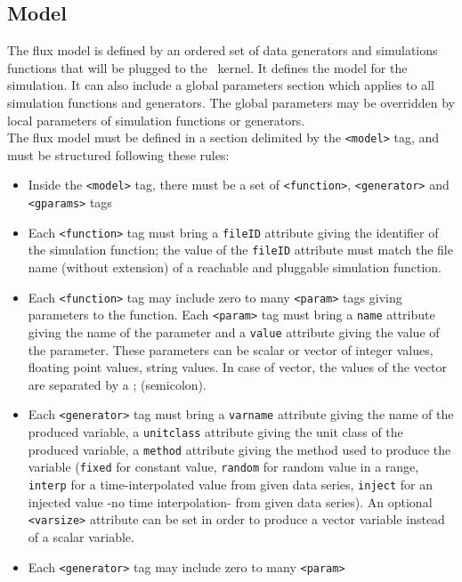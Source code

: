 \subsection{Model}

The flux model is defined by an ordered set of data generators and simulations
functions that will be plugged to the \OFname \ kernel. It defines the model
for the simulation. It can also include a global parameters section which
applies to all simulation functions and generators. The global parameters may
be overridden by local parameters of simulation functions or generators.\\
\noindent The flux model must be defined in a section delimited by the
\texttt{<model>} tag, and must be structured following these rules:
\begin{itemize}
  \item Inside the \texttt{<model>} tag, there must be a set of
  \texttt{<function>}, \texttt{<generator>} and \texttt{<gparams>} tags
  \item Each \texttt{<function>} tag must bring a \texttt{fileID} attribute giving
  the identifier of the simulation function; the value of the \texttt{fileID}
  attribute must match the file name (without extension) of a reachable and
  pluggable simulation function.
  \item Each \texttt{<function>} tag may include zero to many \texttt{<param>} tags giving
  parameters to the function. Each \texttt{<param>} tag must bring a \texttt{name} attribute giving
  the name of the parameter and a \texttt{value} attribute giving the value of the parameter. These parameters can be scalar or vector of integer values, floating point values, string values. In case of vector, the values of the vector are separated by a ; (semicolon).
  \item Each \texttt{<generator>} tag must bring a \texttt{varname} attribute giving 
  the name of the produced variable, a \texttt{unitclass} attribute giving the 
  unit class of the produced variable, a \texttt{method} attribute giving the 
  method used to produce the variable (\texttt{fixed} for constant value,
  \texttt{random} for random value in a range, \texttt{interp} for a time-interpolated
  value from given data series, \texttt{inject} for an
  injected value -no time interpolation- from given data series). An optional \texttt{<varsize>}
  attribute can be set in order to produce a vector variable instead of a scalar variable.
  \item Each \texttt{<generator>} tag may include zero to many \texttt{<param>}

\end{itemize}
